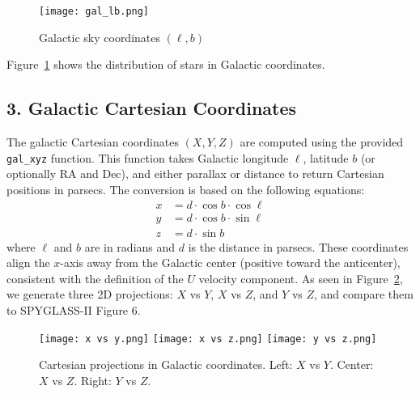 \documentclass[11pt]{article}
\begin{document}
\begin{figure}[H]
    \centering
    \texttt{[image: gal\_lb.png]}
    \caption{Galactic sky coordinates $(\ell, b)$}
    \label{fig:gal_lb}
\end{figure}

Figure~\ref{fig:gal_lb} shows the distribution of stars in Galactic coordinates.


\subsection*{3. Galactic Cartesian Coordinates}
The galactic Cartesian coordinates $(X, Y, Z)$ are computed using the provided \texttt{gal\_xyz} function. This function takes Galactic longitude $\ell$, latitude $b$ (or optionally RA and Dec), and either parallax or distance to return Cartesian positions in parsecs. The conversion is based on the following equations:
\begin{align}
    x &= d \cdot \cos b \cdot \cos \ell \\
    y &= d \cdot \cos b \cdot \sin \ell \\
    z &= d \cdot \sin b \label{eq:xyz}
\end{align}
where $\ell$ and $b$ are in radians and $d$ is the distance in parsecs. These coordinates align the $x$-axis away from the Galactic center (positive toward the anticenter), consistent with the definition of the $U$ velocity component. As seen in Figure~\ref{fig:xyz}, we generate three 2D projections: $X$ vs $Y$, $X$ vs $Z$, and $Y$ vs $Z$, and compare them to SPYGLASS-II Figure 6.

\begin{figure}[H]
    \centering
    \texttt{[image: x vs y.png]}
    \texttt{[image: x vs z.png]}
    \texttt{[image: y vs z.png]}
    \caption{Cartesian projections in Galactic coordinates. Left: $X$ vs $Y$. Center: $X$ vs $Z$. Right: $Y$ vs $Z$.}
    \label{fig:xyz}
\end{figure}
\end{document}
